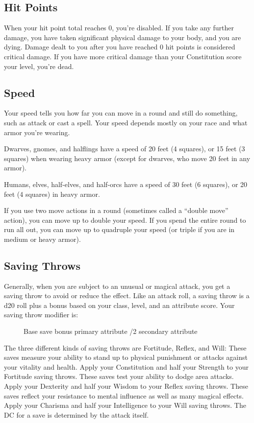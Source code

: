 \subsection{Hit Points}
When your hit point total reaches 0, you're disabled. If you take any further damage, you have taken significant physical damage to your body, and you are dying. Damage dealt to you after you have reached 0 hit points is considered critical damage. If you have more critical damage than your Constitution score \add your level, you're dead.

\subsection{Speed}
Your speed tells you how far you can move in a round and still do something, such as attack or cast a spell. Your speed depends mostly on your race and what armor you're wearing.

Dwarves, gnomes, and halflings have a speed of 20 feet (4 squares), or 15 feet (3 squares) when wearing heavy armor (except for dwarves, who move 20 feet in any armor).

Humans, elves, half-elves, and half-orcs have a speed of 30 feet (6 squares), or 20 feet (4 squares) in heavy armor.

If you use two move actions in a round (sometimes called a ``double move'' action), you can move up to double your speed. If you spend the entire round to run all out, you can move up to quadruple your speed (or triple if you are in medium or heavy armor).

\subsection{Saving Throws}
Generally, when you are subject to an unusual or magical attack, you get a saving throw to avoid or reduce the effect. Like an attack roll, a saving throw is a d20 roll plus a bonus based on your class, level, and an attribute score. Your saving throw modifier is:
\begin{figure}[h]
\centering Base save bonus \add primary attribute /2 secondary attribute
\end{figure}

 The three different kinds of saving throws are Fortitude, Reflex, and Will:
 These saves measure your ability to stand up to physical punishment or attacks against your vitality and health. Apply your Constitution and half your Strength to your Fortitude saving throws.
 These saves test your ability to dodge area attacks. Apply your Dexterity and half your Wisdom to your Reflex saving throws.
 These saves reflect your resistance to mental influence as well as many magical effects. Apply your Charisma and half your Intelligence to your Will saving throws.
 The DC for a save is determined by the attack itself.


